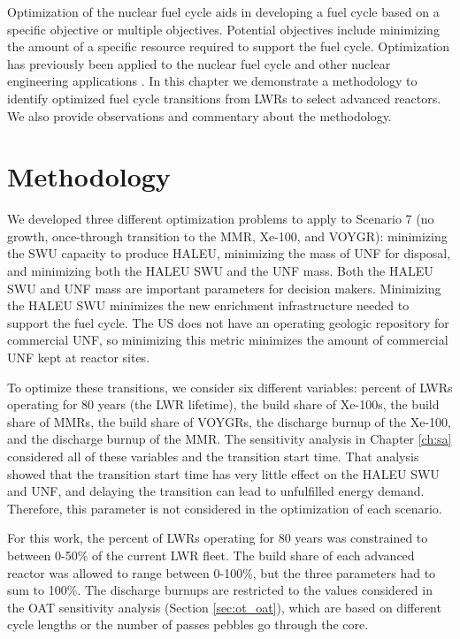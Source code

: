 Optimization of the nuclear fuel cycle aids in developing
a fuel cycle based on a specific objective or  multiple objectives. 
Potential objectives include minimizing the amount of a specific 
resource required to support the fuel cycle. 
Optimization has previously been applied to the nuclear fuel 
cycle \cite{passerini_sensitivity_2012,andrianov_optimization_2019}
and other nuclear engineering applications 
\cite{chee_fluoride-salt-cooled_2022}.
In this chapter we demonstrate a methodology to identify
optimized fuel cycle transitions from \glspl{LWR} to select 
advanced reactors. We also provide observations and 
commentary about the methodology. 

\section{Methodology}
We developed three different optimization problems to apply to 
Scenario 7 (no growth, once-through transition to the \gls{MMR}, Xe-100, 
and VOYGR): minimizing the \gls{SWU} capacity to 
produce \gls{HALEU}, minimizing the mass of \gls{UNF} for disposal, 
and minimizing both the \gls{HALEU} \gls{SWU} and the \gls{UNF} 
mass. Both the \gls{HALEU} \gls{SWU} and \gls{UNF} mass are important 
parameters for decision makers. Minimizing the \gls{HALEU} \gls{SWU} 
minimizes the new enrichment infrastructure needed to support the 
fuel cycle. The US does not have an operating geologic 
repository for commercial \gls{UNF}, so minimizing this metric 
minimizes the amount of commercial \gls{UNF} kept at reactor 
sites. 

To optimize these transitions, we consider six different 
variables: percent of \glspl{LWR} operating for 80 years (the \gls{LWR} 
lifetime), the build share 
of Xe-100s, the build share of \glspl{MMR}, the build share of VOYGRs, 
the discharge burnup of the Xe-100, and the discharge burnup of the 
\gls{MMR}. The sensitivity analysis in Chapter \ref{ch:sa} considered 
all of these variables and the transition start time. That analysis 
showed that the transition start time has
very little effect on the \gls{HALEU} \gls{SWU} and \gls{UNF},
and delaying the transition 
can lead to unfulfilled energy demand. Therefore, this parameter is 
not considered in the optimization of each scenario. 

For this work, the percent of \glspl{LWR} operating for 80 years 
was constrained to between 0-50\% of the current \gls{LWR} fleet. 
The build share of each advanced reactor was allowed to range between 
0-100\%, but the three parameters had to sum to 100\%. The discharge 
burnups are restricted to the values considered in the \gls{OAT} 
sensitivity analysis (Section \ref{sec:ot_oat}), which are based 
on different cycle lengths or 
the number of passes pebbles go through the core.

